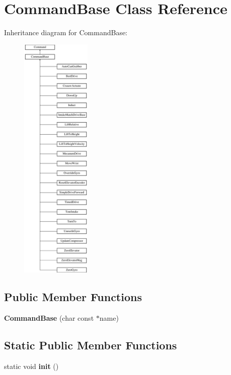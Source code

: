 \hypertarget{class_command_base}{}\section{Command\+Base Class Reference}
\label{class_command_base}
Inheritance diagram for Command\+Base\+:\begin{figure}[H]
\begin{center}
\leavevmode
\includegraphics[height=12.000000cm]{class_command_base}
\end{center}
\end{figure}
\subsection*{Public Member Functions}
\begin{DoxyCompactItemize}
\item 
\hypertarget{class_command_base_a41d5830644dae72497af945aafac9176}{}{\bfseries Command\+Base} (char const $\ast$name)\label{class_command_base_a41d5830644dae72497af945aafac9176}

\end{DoxyCompactItemize}
\subsection*{Static Public Member Functions}
\begin{DoxyCompactItemize}
\item 
\hypertarget{class_command_base_a4dbfcd3b6ae92d752bc36a29dd1e1a5a}{}static void {\bfseries init} ()\label{class_command_base_a4dbfcd3b6ae92d752bc36a29dd1e1a5a}

\end{DoxyCompactItemize}
